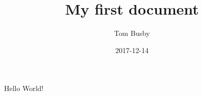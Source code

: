 \documentclass{article}
\title{My first document}
\date{2017-12-14}
\author{Tom Busby}
\begin{document}
  \maketitle
  \newpage

  Hello World!
\end{document}
